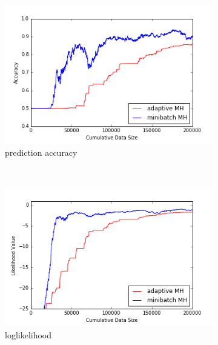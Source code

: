 \documentclass{article}
\begin{document}
\begin{figure}[t]
    \centering
    \begin{subfigure}[b]{0.32\textwidth}
        \includegraphics[width=\textwidth]{./figures/acc_hyc.png}
        \caption{prediction accuracy}
        \label{fig:logistic_pa}
    \end{subfigure}
    ~ %
    \begin{subfigure}[b]{0.32\textwidth}
        \includegraphics[width=\textwidth]{./figures/ll_hyc.png}
        \caption{loglikelihood}
        \label{fig:logistic_ll}
    \end{subfigure}
    ~ %
    \begin{subfigure}[b]{0.32\textwidth}

\end{subfigure}
\end{figure}
\end{document}

